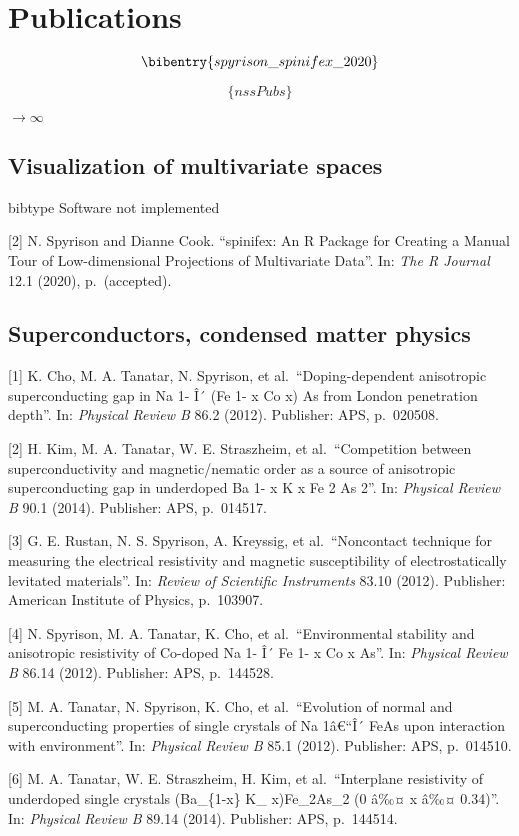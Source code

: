 \documentclass[10pt,a4paper,]{article}
\begin{document}
\hypertarget{publications}{%
\section{Publications}\label{publications}}

\[
\bibentry\{spyrison\_spinifex\_2020\}
\]

\[
\{nssPubs\}
\]

\(\to \infty\)

\hypertarget{visualization-of-multivariate-spaces}{%
\subsection{Visualization of multivariate spaces}\label{visualization-of-multivariate-spaces}}

bibtype Software not implemented

{[}2{]} N. Spyrison and Dianne Cook. ``spinifex: An R Package for Creating a
Manual Tour of Low-dimensional Projections of Multivariate Data''. In:
\emph{The R Journal} 12.1 (2020), p.~(accepted).

\hypertarget{superconductors-condensed-matter-physics}{%
\subsection{Superconductors, condensed matter physics}\label{superconductors-condensed-matter-physics}}

{[}1{]} K. Cho, M. A. Tanatar, N. Spyrison, et al.~``Doping-dependent
anisotropic superconducting gap in Na 1- Î´ (Fe 1- x Co x) As from
London penetration depth''. In: \emph{Physical Review B} 86.2 (2012).
Publisher: APS, p.~020508.

{[}2{]} H. Kim, M. A. Tanatar, W. E. Straszheim, et al.~``Competition
between superconductivity and magnetic/nematic order as a source of
anisotropic superconducting gap in underdoped Ba 1- x K x Fe 2 As 2''.
In: \emph{Physical Review B} 90.1 (2014). Publisher: APS, p.~014517.

{[}3{]} G. E. Rustan, N. S. Spyrison, A. Kreyssig, et al.~``Noncontact
technique for measuring the electrical resistivity and magnetic
susceptibility of electrostatically levitated materials''. In: \emph{Review
of Scientific Instruments} 83.10 (2012). Publisher: American Institute
of Physics, p.~103907.

{[}4{]} N. Spyrison, M. A. Tanatar, K. Cho, et al.~``Environmental stability
and anisotropic resistivity of Co-doped Na 1- Î´ Fe 1- x Co x As''. In:
\emph{Physical Review B} 86.14 (2012). Publisher: APS, p.~144528.

{[}5{]} M. A. Tanatar, N. Spyrison, K. Cho, et al.~``Evolution of normal and
superconducting properties of single crystals of Na 1â€``Î´ FeAs upon
interaction with environment''. In: \emph{Physical Review B} 85.1 (2012).
Publisher: APS, p.~014510.

{[}6{]} M. A. Tanatar, W. E. Straszheim, H. Kim, et al.~``Interplane
resistivity of underdoped single crystals (Ba\_\{1-x\} K\_ x)Fe\_2As\_2
(0 â‰¤ x â‰¤ 0.34)''. In: \emph{Physical Review B} 89.14 (2014). Publisher:
APS, p.~144514.
\end{document}
